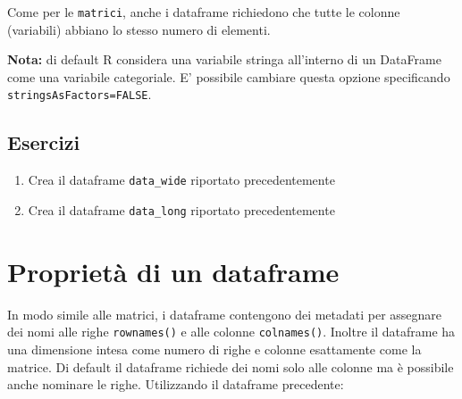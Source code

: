 \documentclass[
]{book}
\providecommand{\tightlist}{%
  \setlength{\itemsep}{0pt}\setlength{\parskip}{0pt}}
\begin{document}
Come per le \texttt{matrici}, anche i dataframe richiedono che tutte le colonne (variabili) abbiano lo stesso numero di elementi.

\textbf{Nota:} di default R considera una variabile stringa all'interno di un DataFrame come una variabile categoriale. E' possibile cambiare questa opzione specificando \texttt{stringsAsFactors=FALSE}.

\hypertarget{esercizi-9}{%
\subsection*{Esercizi}\label{esercizi-9}}

\begin{enumerate}
\def\labelenumi{\arabic{enumi}.}
\tightlist
\item
  Crea il dataframe \texttt{data\_wide} riportato precedentemente
\item
  Crea il dataframe \texttt{data\_long} riportato precedentemente
\end{enumerate}

\hypertarget{proprietuxe0-di-un-dataframe}{%
\section{Proprietà di un dataframe}\label{proprietuxe0-di-un-dataframe}}

In modo simile alle matrici, i dataframe contengono dei metadati per assegnare dei nomi alle righe \texttt{rownames()} e alle colonne \texttt{colnames()}. Inoltre il dataframe ha una dimensione intesa come numero di righe e colonne esattamente come la matrice. Di default il dataframe richiede dei nomi solo alle colonne ma è possibile anche nominare le righe. Utilizzando il dataframe precedente:
\end{document}
